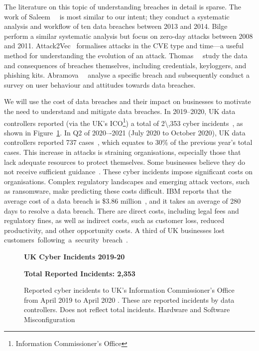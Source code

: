The literature on this topic of understanding breaches in detail is sparse. The work of Saleem~\etal~\cite{saleem_sok_2020} is most similar to our intent; they conduct a systematic analysis and workflow of ten data breaches between 2013 and 2014. Bilge~\etal~\cite{bilge_before_2012} perform a similar systematic analysis but focus on zero-day attacks between 2008 and 2011. Attack2Vec~\cite{shen_attack2vec_2019} formalises attacks in the CVE type and time---a useful method for understanding the evolution of an attack. Thomas~\etal~\cite{thomas_data_2017} study the data and consequences of breaches themselves, including credentials, keyloggers, and phishing kits. Abramova~\etal~\cite{abramova_anatomy_2023} analyse a specific breach and subsequently conduct a survey on user behaviour and attitudes towards data breaches.

We will use the cost of data breaches and their impact on businesses to motivate the need to understand and mitigate data breaches. In 2019--2020, UK data controllers reported (via the UK's ICO\footnote{Information Commissioner's Office}) a total of \num{2\,353} cyber incidents~\cite{ico_historical_2020}, as shown in Figure~\ref{fig:1920pie}. In Q2 of 2020–-2021 (July 2020 to October 2020), UK data controllers reported \num{737} cases~\cite{ico_historical_2020}, which equates to 30\% of the previous year's total cases. This increase in attacks is straining organisations, especially those that lack adequate resources to protect themselves. Some businesses believe they do not receive sufficient guidance~\cite{furdui_502_2019}. These cyber incidents impose significant costs on organisations. Complex regulatory landscapes and emerging attack vectors, such as ransomware, make predicting these costs difficult. IBM reports that the average cost of a data breach is \$3.86 million~\cite{ibm_security_ibm-2020_2020}, and it takes an average of 280 days to resolve a data breach. There are direct costs, including legal fees and regulatory fines, as well as indirect costs, such as customer loss, reduced productivity, and other opportunity costs. A third of UK businesses lost customers~following~a~security~breach~\cite{furdui_502_2019}.

\begin{figure}[t]
\centering
\textbf{UK Cyber Incidents 2019-20}\par
\textbf{Total Reported Incidents: 2,353}\par\medskip
{}
\caption{Reported cyber incidents to UK’s Information Commissioner’s Office from April 2019 to April 2020 \cite{ico_historical_2020}. These are reported incidents by data controllers. Does not reflect total incidents. \* Hardware and Software Misconfiguration}
\label{fig:1920pie}
\end{figure}


